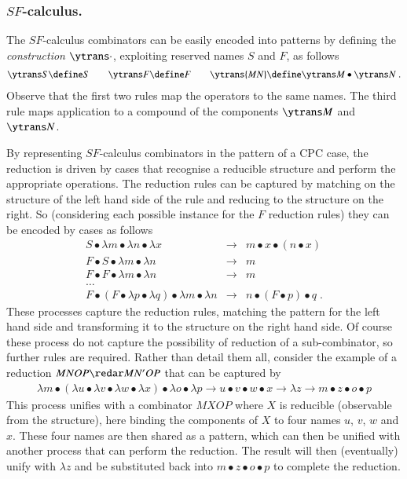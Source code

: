 \documentclass{llncs}
\renewcommand{\rew}{\redar}
\begin{document}
\subsubsection*{$SF$-calculus.}
\label{sssec:SF2CPC}

The $SF$-calculus combinators  can be easily encoded into patterns by defining the {\em construction} $\ytrans\cdot$, exploiting reserved names $S$ and $F$, as follows
\begin{eqnarray*}
\ytrans S \define S\qquad
\ytrans F \define F\qquad
\ytrans {M N} \define \ytrans M \bullet\ytrans N\; .
\end{eqnarray*}
Observe that the first two rules map the operators to the same names. The third rule maps application to a compound of the components $\ytrans M$ and $\ytrans N$.

By representing $SF$-calculus combinators in the pattern of a CPC case,
the reduction is driven by cases that recognise a reducible structure and perform the appropriate operations.
The reduction rules can be captured by matching on the structure of the left hand side of the rule and reducing to the structure on the right. So (considering each possible instance for the $F$ reduction rules) they can be encoded by cases as follows
\small
\begin{eqnarray*}
S\bullet \lambda m\bullet \lambda n\bullet \lambda x &\to& m\bullet x\bullet (n\bullet x)\\
F\bullet S\bullet \lambda m\bullet \lambda n &\to& m\\
F\bullet F\bullet \lambda m\bullet \lambda n &\to& m\\
\dots\\
F\bullet (F\bullet\lambda p\bullet \lambda q)\bullet \lambda m\bullet \lambda n &\to&n\bullet (F\bullet p)\bullet q\; .
\end{eqnarray*}
\normalsize
These processes capture the reduction rules, matching the pattern for the left hand side and transforming it to the structure on the right hand side.
Of course these process do not capture the possibility of reduction of a sub-combinator, so further rules are required.
Rather than detail them all, consider the example of a reduction $MNOP \rew MN'OP$ that can be captured by
\begin{eqnarray*}
\lambda m\bullet (\lambda u\bullet \lambda v\bullet \lambda w\bullet \lambda x) \bullet \lambda o\bullet \lambda p
\to u\bullet v\bullet w\bullet x \to \lambda z \to m \bullet z\bullet o\bullet p
\end{eqnarray*}
This process unifies with a combinator $MXOP$ where $X$ is reducible (observable from the structure), here binding the components of $X$ to four names $u$, $v$, $w$ and $x$. These four names are then shared as a pattern, which can then be unified with another process that can perform the reduction. The result will then (eventually) unify with $\lambda z$ and be substituted back into $m\bullet z\bullet o\bullet p$ to complete the reduction.
\end{document}
